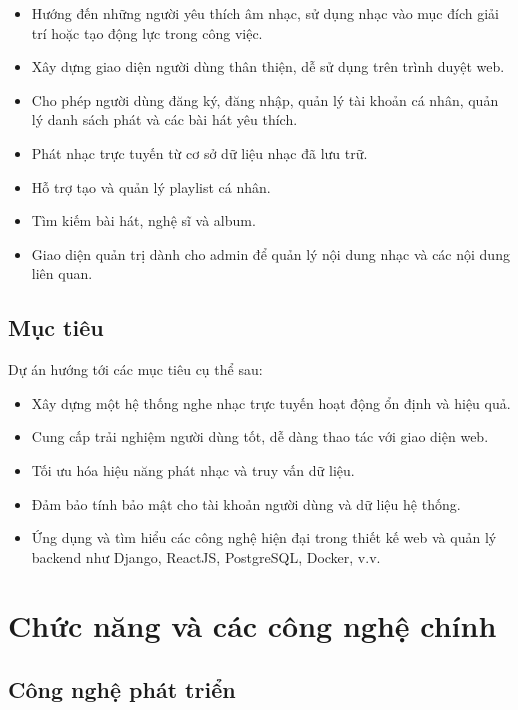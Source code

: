 \documentclass[a4paper,12pt]{article}
\begin{document}
\begin{itemize}
	\item Hướng đến những người yêu thích âm nhạc, sử dụng nhạc vào mục đích giải trí hoặc tạo động lực trong công việc.
    \item Xây dựng giao diện người dùng thân thiện, dễ sử dụng trên trình duyệt web.
    \item Cho phép người dùng đăng ký, đăng nhập, quản lý tài khoản cá nhân, quản lý danh sách phát và các bài hát yêu thích.
    \item Phát nhạc trực tuyến từ cơ sở dữ liệu nhạc đã lưu trữ.
    \item Hỗ trợ tạo và quản lý playlist cá nhân.
    \item Tìm kiếm bài hát, nghệ sĩ và album.
    \item Giao diện quản trị dành cho admin để quản lý nội dung nhạc và các nội dung liên quan.
\end{itemize}

\subsection{Mục tiêu}
Dự án hướng tới các mục tiêu cụ thể sau:

\begin{itemize}
    \item Xây dựng một hệ thống nghe nhạc trực tuyến hoạt động ổn định và hiệu quả.
    \item Cung cấp trải nghiệm người dùng tốt, dễ dàng thao tác với giao diện web.
    \item Tối ưu hóa hiệu năng phát nhạc và truy vấn dữ liệu.
    \item Đảm bảo tính bảo mật cho tài khoản người dùng và dữ liệu hệ thống.
    \item Ứng dụng và tìm hiểu các công nghệ hiện đại trong thiết kế web và quản lý backend như Django, ReactJS, PostgreSQL, Docker, v.v.
\end{itemize}

\newpage
\section{Chức năng và các công nghệ chính}

\subsection{Công nghệ phát triển}
\end{document}
